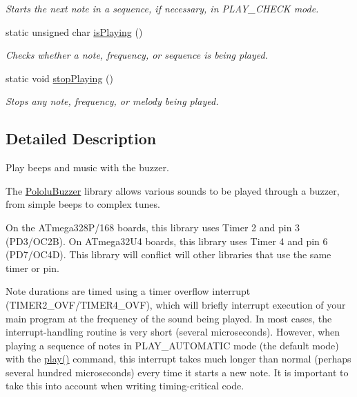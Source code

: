 \begin{DoxyCompactItemize}
\begin{DoxyCompactList}\small\item\em Starts the next note in a sequence, if necessary, in {\ttfamily P\+L\+A\+Y\+\_\+\+C\+H\+E\+CK} mode. \end{DoxyCompactList}\item 
static unsigned char \hyperlink{class_pololu_buzzer_a8045fdf0a144e0b71a5b223a0ef34027}{is\+Playing} ()
\begin{DoxyCompactList}\small\item\em Checks whether a note, frequency, or sequence is being played. \end{DoxyCompactList}\item 
static void \hyperlink{class_pololu_buzzer_a233fe0ffe5f23582b1c55beaa718d527}{stop\+Playing} ()
\begin{DoxyCompactList}\small\item\em Stops any note, frequency, or melody being played. \end{DoxyCompactList}\end{DoxyCompactItemize}


\subsection{Detailed Description}
Play beeps and music with the buzzer. 

The \hyperlink{class_pololu_buzzer}{Pololu\+Buzzer} library allows various sounds to be played through a buzzer, from simple beeps to complex tunes.

On the A\+Tmega328\+P/168 boards, this library uses Timer 2 and pin 3 (P\+D3/\+O\+C2B). On A\+Tmega32\+U4 boards, this library uses Timer 4 and pin 6 (P\+D7/\+O\+C4D). This library will conflict will other libraries that use the same timer or pin.

Note durations are timed using a timer overflow interrupt ({\ttfamily T\+I\+M\+E\+R2\+\_\+\+O\+VF}/{\ttfamily T\+I\+M\+E\+R4\+\_\+\+O\+VF}), which will briefly interrupt execution of your main program at the frequency of the sound being played. In most cases, the interrupt-\/handling routine is very short (several microseconds). However, when playing a sequence of notes in {\ttfamily P\+L\+A\+Y\+\_\+\+A\+U\+T\+O\+M\+A\+T\+IC} mode (the default mode) with the {\ttfamily \hyperlink{class_pololu_buzzer_a22f45ef7cdf9dc8fc54e617244368277}{play()}} command, this interrupt takes much longer than normal (perhaps several hundred microseconds) every time it starts a new note. It is important to take this into account when writing timing-\/critical code.

